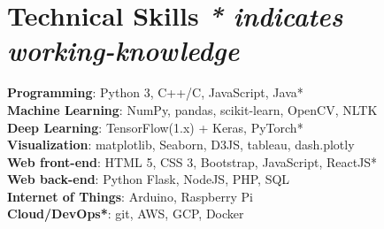 \documentclass[letterpaper,11pt, ]{article}
\begin{document}
\section{Technical Skills \null \hfill {\normalfont \textit{* indicates working-knowledge}} }

\begin{multicols}{2}
 \begin{itemize}[leftmargin=0.15in, label={}]
    \small{\item{
        \textbf{Programming}{: Python 3, C++/C, JavaScript, Java* \\
        \textbf{Machine Learning}{: NumPy, pandas, scikit-learn, OpenCV, NLTK} \\
        \textbf{Deep Learning}{: TensorFlow(1.x) + Keras, PyTorch*} \\
        \textbf{Visualization}{: matplotlib, Seaborn, D3JS, tableau, dash.plotly} \\
        
        
        \textbf{Web front-end}{: HTML 5, CSS 3, Bootstrap, JavaScript, ReactJS*} \\
        \textbf{Web back-end}{: Python Flask, NodeJS, PHP, SQL} \\
        \textbf{Internet of Things}{: Arduino, Raspberry Pi} \\
        \textbf{Cloud/DevOps*}{: git, AWS, GCP, Docker} \\
    }}}
 \end{itemize}
\end{multicols}
\vspace{-10pt}
\end{document}
